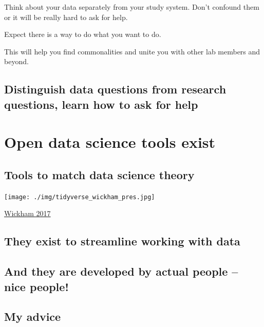 \documentclass[
  letterpaper,
  DIV=11,
  numbers=noendperiod]{scrreprt}
\begin{document}
Think about your data separately from your study system. Don't confound
them or it will be really hard to ask for help.

Expect there is a way to do what you want to do.

This will help you find commonalities and unite you with other lab
members and beyond.

\hypertarget{distinguish-data-questions-from-research-questions-learn-how-to-ask-for-help}{%
\subsection{Distinguish data questions from research questions, learn
how to ask for
help}\label{distinguish-data-questions-from-research-questions-learn-how-to-ask-for-help}}

\hypertarget{open-data-science-tools-exist}{%
\section{Open data science tools
exist}\label{open-data-science-tools-exist}}

\hypertarget{tools-to-match-data-science-theory}{%
\subsection{Tools to match data science
theory}\label{tools-to-match-data-science-theory}}

\texttt{[image: ./img/tidyverse\_wickham\_pres.jpg]}

\href{}{Wickham 2017}

\hypertarget{they-exist-to-streamline-working-with-data}{%
\subsection{They exist to streamline working with
data}\label{they-exist-to-streamline-working-with-data}}

\hypertarget{and-they-are-developed-by-actual-people-nice-people}{%
\subsection{And they are developed by actual people -- nice
people!}\label{and-they-are-developed-by-actual-people-nice-people}}

\hypertarget{my-advice}{%
\subsection{My advice}\label{my-advice}}
\end{document}
